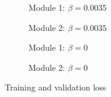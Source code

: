 \begin{figure}[h] %
	\centering
	\begin{subfigure}[b]{0.45\textwidth}
		\centering
		
		\caption{Module 1: $\beta=0.0035$}
	\end{subfigure}
	\hfill
	\begin{subfigure}[b]{0.45\textwidth}
		\centering
		
		\caption{Module 2: $\beta=0.0035$}
	\end{subfigure}		
	\hfill
	
	\begin{subfigure}[b]{0.45\textwidth}
		\centering
		
		\caption{Module 1: $\beta=0$}
	\end{subfigure}
	\hfill
	\begin{subfigure}[b]{0.45\textwidth}
		\centering
		
		\caption{Module 2: $\beta=0$}
	\end{subfigure}
	\caption{Training and validation loss}
	\label{fig:four_losses}
\end{figure}